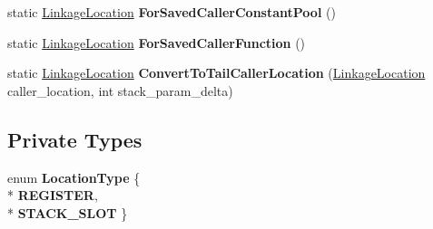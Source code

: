 \begin{DoxyCompactItemize}
\item 
static \hyperlink{classv8_1_1internal_1_1compiler_1_1_linkage_location}{Linkage\+Location} {\bfseries For\+Saved\+Caller\+Constant\+Pool} ()\hypertarget{classv8_1_1internal_1_1compiler_1_1_linkage_location_a6930e2b0222b435bd52cd9c4ad081c67}{}\label{classv8_1_1internal_1_1compiler_1_1_linkage_location_a6930e2b0222b435bd52cd9c4ad081c67}

\item 
static \hyperlink{classv8_1_1internal_1_1compiler_1_1_linkage_location}{Linkage\+Location} {\bfseries For\+Saved\+Caller\+Function} ()\hypertarget{classv8_1_1internal_1_1compiler_1_1_linkage_location_a4b140765a5213e683a9f9c81f2a44a3d}{}\label{classv8_1_1internal_1_1compiler_1_1_linkage_location_a4b140765a5213e683a9f9c81f2a44a3d}

\item 
static \hyperlink{classv8_1_1internal_1_1compiler_1_1_linkage_location}{Linkage\+Location} {\bfseries Convert\+To\+Tail\+Caller\+Location} (\hyperlink{classv8_1_1internal_1_1compiler_1_1_linkage_location}{Linkage\+Location} caller\+\_\+location, int stack\+\_\+param\+\_\+delta)\hypertarget{classv8_1_1internal_1_1compiler_1_1_linkage_location_aa7d35e0c3037ce3e6f41b0997f42a918}{}\label{classv8_1_1internal_1_1compiler_1_1_linkage_location_aa7d35e0c3037ce3e6f41b0997f42a918}

\end{DoxyCompactItemize}
\subsection*{Private Types}
\begin{DoxyCompactItemize}
\item 
enum {\bfseries Location\+Type} \{ \\*
{\bfseries R\+E\+G\+I\+S\+T\+ER}, 
\\*
{\bfseries S\+T\+A\+C\+K\+\_\+\+S\+L\+OT}
 \}\hypertarget{classv8_1_1internal_1_1compiler_1_1_linkage_location_a6b7067619d2f70bc4df703198b68741d}{}\label{classv8_1_1internal_1_1compiler_1_1_linkage_location_a6b7067619d2f70bc4df703198b68741d}

\end{DoxyCompactItemize}
